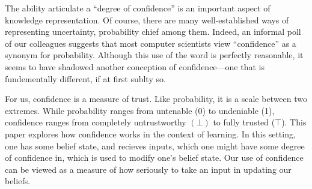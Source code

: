 \documentclass{article}
\begin{document}
The ability articulate a ``degree of confidence'' is an important aspect of knowledge representation.
Of course, there are many well-established ways of representing uncertainty,
	probability chief among them.
Indeed, an informal poll of our colleagues suggests that most computer scientists view ``confidence'' as a synonym for probability.
Although this use of the word is perfectly reasonable, it seems to have shadowed another conception of confidence---one that is fundementally different, if at first sublty so. 
 





For us, confidence is a measure of trust. 
Like probability, it is a scale between two extremes. 
While probability ranges from untenable (0) to undeniable (1),
confidence ranges from completely untrustworthy $(\bot)$ to fully trusted ($\top$). 
%
This paper explores how confidence works in the context of learning.
In this setting, one has some belief state, and recieves inputs, which one might have some degree of confidence in, which is used to modify one's belief state. 
Our use of confidence can be viewed as a measure of how seriously to take an input in updating our beliefs.
\end{document}
